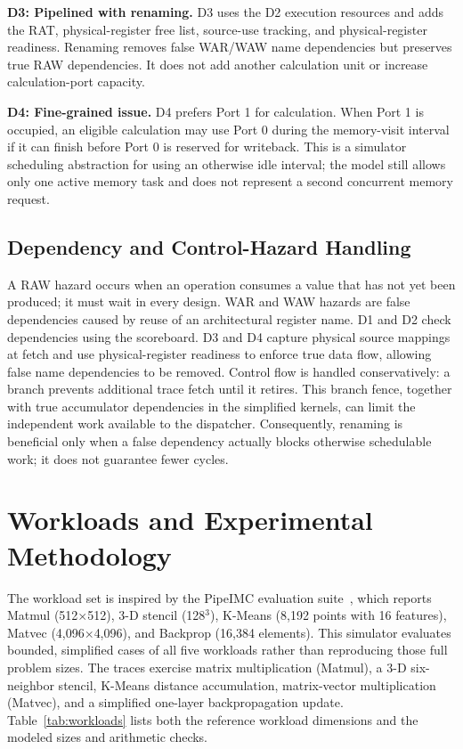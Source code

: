 \documentclass[conference]{IEEEtran}
\begin{document}
\textbf{D3: Pipelined with renaming.} D3 uses the D2 execution resources and adds the RAT, physical-register free list, source-use tracking, and physical-register readiness. Renaming removes false WAR/WAW name dependencies but preserves true RAW dependencies. It does not add another calculation unit or increase calculation-port capacity.

\textbf{D4: Fine-grained issue.} D4 prefers Port 1 for calculation. When Port 1 is occupied, an eligible calculation may use Port 0 during the memory-visit interval if it can finish before Port 0 is reserved for writeback. This is a simulator scheduling abstraction for using an otherwise idle interval; the model still allows only one active memory task and does not represent a second concurrent memory request.

\subsection{Dependency and Control-Hazard Handling}
A RAW hazard occurs when an operation consumes a value that has not yet been produced; it must wait in every design. WAR and WAW hazards are false dependencies caused by reuse of an architectural register name. D1 and D2 check dependencies using the scoreboard. D3 and D4 capture physical source mappings at fetch and use physical-register readiness to enforce true data flow, allowing false name dependencies to be removed. Control flow is handled conservatively: a branch prevents additional trace fetch until it retires. This branch fence, together with true accumulator dependencies in the simplified kernels, can limit the independent work available to the dispatcher. Consequently, renaming is beneficial only when a false dependency actually blocks otherwise schedulable work; it does not guarantee fewer cycles.

\section{Workloads and Experimental Methodology}
The workload set is inspired by the PipeIMC evaluation suite~\cite{pipeimc}, which reports Matmul (512$\times$512), 3-D stencil (128$^3$), K-Means (8,192 points with 16 features), Matvec (4,096$\times$4,096), and Backprop (16,384 elements). This simulator evaluates bounded, simplified cases of all five workloads rather than reproducing those full problem sizes. The traces exercise matrix multiplication (Matmul), a 3-D six-neighbor stencil, K-Means distance accumulation, matrix-vector multiplication (Matvec), and a simplified one-layer backpropagation update. Table~\ref{tab:workloads} lists both the reference workload dimensions and the modeled sizes and arithmetic checks.
\end{document}
